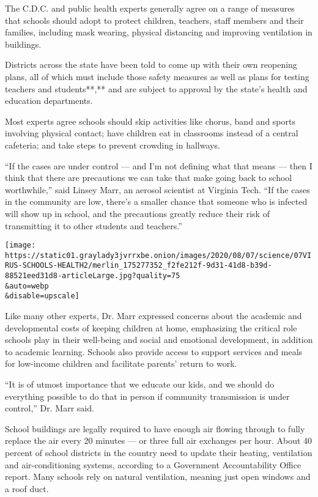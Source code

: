 The C.D.C. and public health experts generally agree on a range of
measures that schools should adopt to protect children, teachers, staff
members and their families, including mask wearing, physical distancing
and improving ventilation in buildings.

Districts across the state have been told to come up with their own
reopening plans, all of which must include those safety measures as well
as plans for testing teachers and students**,** and are subject to
approval by the state's health and education departments.

Most experts agree schools should skip activities like chorus, band and
sports involving physical contact; have children eat in classrooms
instead of a central cafeteria; and take steps to prevent crowding in
hallways.

``If the cases are under control --- and I'm not defining what that
means --- then I think that there are precautions we can take that make
going back to school worthwhile,'' said Linsey Marr, an aerosol
scientist at Virginia Tech. ``If the cases in the community are low,
there's a smaller chance that someone who is infected will show up in
school, and the precautions greatly reduce their risk of transmitting it
to other students and teachers.''

\texttt{[image: https://static01.graylady3jvrrxbe.onion/images/2020/08/07/science/07VIRUS-SCHOOLS-HEALTH2/merlin\_175277352\_f2fe212f-9d31-41d8-b39d-88521eed31d8-articleLarge.jpg?quality=75\\\&auto=webp\\\&disable=upscale]}

Like many other experts, Dr. Marr expressed concerns about the academic
and developmental costs of keeping children at home, emphasizing the
critical role schools play in their well-being and social and emotional
development, in addition to academic learning. Schools also provide
access to support services and meals for low-income children and
facilitate parents' return to work.

``It is of utmost importance that we educate our kids, and we should do
everything possible to do that in person if community transmission is
under control,'' Dr. Marr said.

School buildings are legally required to have enough air flowing through
to fully replace the air every 20 minutes --- or three full air
exchanges per hour. About 40 percent of school districts in the country
need to update their heating, ventilation and air-conditioning systems,
according to a Government Accountability Office report. Many schools
rely on natural ventilation, meaning just open windows and a roof duct.

